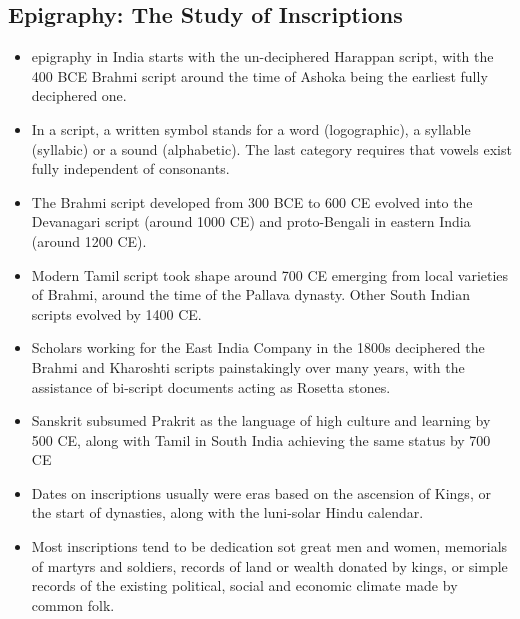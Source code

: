 \subsection{Epigraphy: The Study of Inscriptions}
\begin{itemize}
    \item \Gls{epigraphy} in India starts with the un-deciphered Harappan script, with the 400 BCE Brahmi script around the time of Ashoka being the earliest fully deciphered one.
    \item In a script, a written symbol stands for a word (logographic), a syllable (syllabic) or a sound (alphabetic). The last category requires that vowels exist fully independent of consonants.
    \item The Brahmi script developed from 300 BCE to 600 CE evolved into the Devanagari script (around 1000 CE) and proto-Bengali in eastern India (around 1200 CE).
    \item Modern Tamil script took shape around 700 CE emerging from local varieties of Brahmi, around the time of the Pallava dynasty. Other South Indian scripts evolved by 1400 CE.
    \item Scholars working for the East India Company in the 1800s deciphered the Brahmi and Kharoshti scripts painstakingly over many years, with the assistance of bi-script documents acting as Rosetta stones.
    \item Sanskrit subsumed Prakrit as the language of high culture and learning by 500 CE, along with Tamil in South India achieving the same status by 700 CE
    \item Dates on inscriptions usually were eras based on the ascension of Kings, or the start of dynasties, along with the luni-solar Hindu calendar.
    \item Most inscriptions tend to be dedication sot great men and women, memorials of martyrs and soldiers, records of land or wealth donated by kings, or simple records of the existing political, social and economic climate made by common folk.
\end{itemize}

